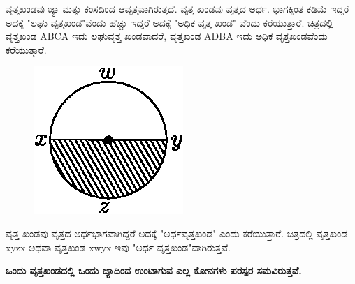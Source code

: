   ವೃತ್ತಖಂಡವು ಜ್ಯಾ ಮತ್ತು ಕಂಸದಿಂದ ಆವೃತ್ತವಾಗಿರುತ್ತದೆ. ವೃತ್ತ ಖಂಡವು ವೃತ್ತದ ಅರ್ಧ. ಭಾಗಕ್ಕಿಂತ ಕಡಿಮೆ ಇದ್ದರೆ ಅದಕ್ಕೆ "ಲಘು ವೃತ್ತಖಂಡ"ವೆಂದು ಹೆಚ್ಚು ಇದ್ದರೆ ಅದಕ್ಕೆ "ಅಧಿಕ ವೃತ್ತ ಖಂಡ" ವೆಂದು ಕರೆಯುತ್ತಾರೆ. ಚಿತ್ರದಲ್ಲಿ ವೃತ್ತಖಂಡ ABCA ಇದು ಲಘುವೃತ್ತ ಖಂಡವಾದರೆ, ವೃತ್ತಖಂಡ ADBA ಇದು ಅಧಿಕ ವೃತ್ತಖಂಡವೆಂದು ಕರೆಯುತ್ತಾರೆ. 
 \begin{figure}[H]
\centering
\includegraphics[scale=.98]{src/figure/chap1/fig1-27.eps}
\end{figure}

 ವೃತ್ತ ಖಂಡವು ವೃತ್ತದ ಅರ್ಧಭಾಗವಾಗಿದ್ದರೆ ಅದಕ್ಕೆ "ಅರ್ಧವೃತ್ತಖಂಡ" ಎಂದು ಕರೆಯುತ್ತಾರೆ. ಚಿತ್ರದಲ್ಲಿ ವೃತ್ತಖಂಡ xyzx ಅಥವಾ ವೃತ್ತಖಂಡ xwyx ಇವು "ಅರ್ಧ ವೃತ್ತಖಂಡ"ವಾಗಿರುತ್ತವೆ. 
 
 \medskip
 \noindent
 \textbf{ಒಂದು ವೃತ್ತಖಂಡದಲ್ಲಿ ಒಂದು ಜ್ಯಾದಿಂದ ಉಂಟಾಗುವ ಎಲ್ಲ ಕೋನಗಳು ಪರಸ್ಪರ ಸಮವಿರುತ್ತವೆ.}
 
